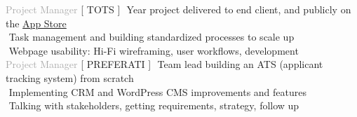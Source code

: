 \begin{cvtable}
{\textcolor{darkgray}{Project Manager}}%
{[ {T\scriptsize OTS} ]}%
{%
\textperiodcentered $ $ Year project delivered to end client, and publicly on the \href{https://apps.apple.com/app/dorotea-subastas/id1608944514}{App Store} \\
     \textperiodcentered $ $ Task management and building standardized processes to scale up \\
    \textperiodcentered $ $ Webpage usability: Hi-Fi wireframing, user workflows, development \\
}
% 
% 
{\textcolor{darkgray}{%
Project Manager}}%
{[ {P\scriptsize REFERATI} ]}%
{%
     \textperiodcentered $ $ Team lead building an ATS (applicant tracking system) from scratch\\
     \textperiodcentered $ $ Implementing CRM and WordPress CMS improvements and features \\
     \textperiodcentered $ $ Talking with stakeholders, %
     getting requirements, strategy, follow up \\  %
} 


\end{cvtable}
